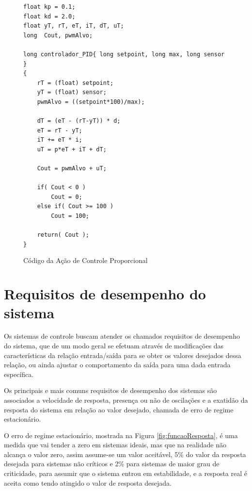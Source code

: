 	
\begin{figure}[!htb]
\centering
\begin{minipage}{0.8\linewidth}
\begin{lstlisting}
float kp = 0.1;
float kd = 2.0;
float yT, rT, eT, iT, dT, uT;
long  Cout, pwmAlvo;

long controlador_PID{ long setpoint, long max, long sensor }
{
    rT = (float) setpoint;
    yT = (float) sensor;
    pwmAlvo = ((setpoint*100)/max);

    dT = (eT - (rT-yT)) * d;
    eT = rT - yT;
    iT += eT * i; 
    uT = p*eT + iT + dT;

    Cout = pwmAlvo + uT;

    if( Cout < 0 )
        Cout = 0;
    else if( Cout >= 100 )
        Cout = 100;

    return( Cout );
}
\end{lstlisting}
\end{minipage}
\caption{Código da Ação de Controle Proporcional}
\label{fig:codigoControladorP}
\end{figure}





\section{Requisitos de desempenho do sistema}

Os sistemas de controle buscam atender os chamados requisitos de desempenho do sistema, que de um modo geral se efetuam através de modificações das características da relação entrada/saída para se obter os valores desejados dessa relação, ou ainda ajustar o comportamento da saída para uma dada entrada específica.

Os principais e mais comuns requisitos de desempenho dos sistemas são associados a velocidade de resposta, presença ou não de oscilações e a exatidão da resposta do sistema em relação ao valor desejado, chamada de erro de regime estacionário.

O erro de regime estacionário, mostrada na Figura \ref{fig:funcaoResposta}, é uma medida que vai tender a zero em sistemas ideais, mas que na realidade não alcança o valor zero, assim assume-se um valor aceitável, 5\% do valor da resposta desejada para sistemas não críticos e 2\% para sistemas de maior grau de criticidade, para assumir que o sistema entrou em estabilidade, e a resposta real é aceita como tendo atingido o valor de resposta desejada. 

